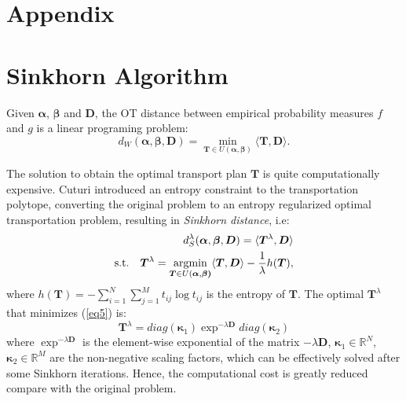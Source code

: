 \newpage
\onecolumn
\appendix
\section*{{\huge Appendix}}
\label{sec:appendix}

\section{Sinkhorn Algorithm}

Given $\boldsymbol{\alpha}$, $\boldsymbol{\beta}$ and $\boldsymbol{D}$, the OT distance between empirical probability measures $f$ and $g$ is a linear programing problem:
\begin{equation}
    d_{W}(\boldsymbol{\alpha},\boldsymbol{\beta},\boldsymbol{D}) = \min_{\boldsymbol{T} \in U(\boldsymbol{\alpha},\boldsymbol{\beta})} \langle \boldsymbol{T},\boldsymbol{D} \rangle.
\end{equation}

The solution to obtain the optimal transport plan $\boldsymbol{T}$ is quite computationally expensive. Cuturi \citep{distances2013lightspeed}
introduced an entropy constraint to the transportation polytope, converting the original problem to an entropy regularized optimal transportation problem, resulting in \textit{Sinkhorn distance}, i.e:
\begin{equation}\label{eq5}
\begin{aligned}
    d_{S}^\lambda (\boldsymbol{\alpha}, \boldsymbol{\beta}, \boldsymbol{D}) = \langle \boldsymbol{T}^\lambda, \boldsymbol{D} \rangle 
    \\
    \text{s.t.} \quad \boldsymbol{T}^\lambda = \operatorname*{argmin}_{\boldsymbol{T} \in U(\boldsymbol{\alpha}, \boldsymbol{\beta)}} \langle \boldsymbol{T}, \boldsymbol{D} \rangle - \frac{1}{\lambda} h(\boldsymbol{T}),
\end{aligned}
\end{equation}
where $h(\boldsymbol{T}) = - \sum_{i=1}^N \sum_{j=1}^M t_{ij}\log t_{ij}$ is the entropy of $\boldsymbol{T}$. The optimal $\boldsymbol{T}^\lambda$ that minimizes (\ref{eq5}) is:
\begin{equation}
    \label{eq:solution}
    \boldsymbol{T}^\lambda = diag(\boldsymbol{\kappa}_1) \exp^{-\lambda\boldsymbol{D}} diag(\boldsymbol{\kappa}_2)
\end{equation}
where $\exp^{-\lambda\boldsymbol{D}}$ is the element-wise exponential of the matrix $-\lambda\boldsymbol{D}$, $\boldsymbol{\kappa}_1 \in \mathbb{R}^N$, $\boldsymbol{\kappa}_2 \in \mathbb{R}^M$ are the non-negative scaling factors, which can be effectively solved after some Sinkhorn iterations. Hence, the computational cost is greatly reduced compare with the original problem.

